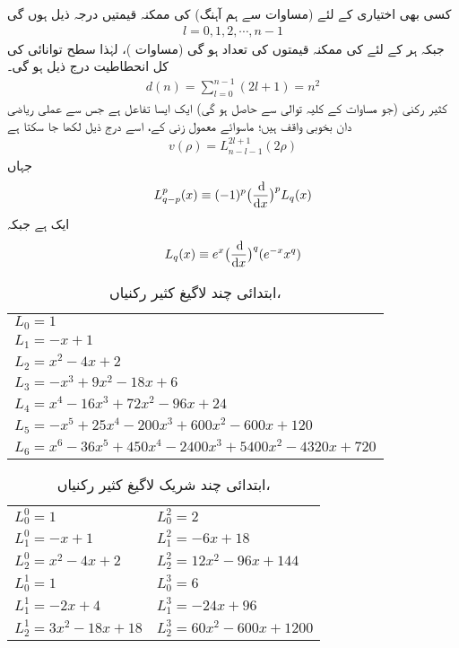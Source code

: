  کسی بھی اختیاری   کے لئے (مساوات  سے ہم آہنگ)  کی ممکنہ قیمتیں درجہ ذیل ہوں گی
\begin{align}
l=0,1,2,\cdots, n-1 
\end{align}
جبکہ ہر   کے لئے    کی ممکنہ قیمتوں کی تعداد    ہو گی (مساوات )،  لہٰذا      سطح توانائی کی کل انحطاطیت درج ذیل ہو گی۔
\begin{align}
d(n)=\sum_{l=0}^{n-1}(2l+1)=n^{2} 
\end{align}
کثیر رکنی  (جو مساوات  کے کلیہ توالی سے حاصل ہو گی) ایک ایسا تفاعل ہے جس سے عملی ریاضی دان بخوبی واقف ہیں؛  ماسوائے معمول زنی کے، اسے درج ذیل لکھا جا سکتا ہے
 \begin{align}\label{مساوات_تین_ابعادی_لاگیغ_الف}
v(\rho)=L_{n-l-1}^{2l+1}(2\rho) 
\end{align}
 جہاں
  \begin{align}\label{مساوات_تین_ابعادی_لاگیغ_ب}
L_{q-p}^{p}(x)\equiv(-1)^{p}\big(\frac{\dif}{\dif{x}}\big)^{p}L_{q}(x) 
\end{align} 
 ایک  ہے جبکہ 
\begin{align}\label{مساوات_تین_ابعادی_لاگیغ_پ}
 L_{q}(x)\equiv e^{x}\big(\frac{\dif}{\dif{x}}\big)^{q}(e^{-x}x^{q}) 
\end{align}
\begin{table}
\caption{ابتدائی چند لاگیغ کثیر رکنیاں، }
\label{جدول_ابعاد_لاگیغ_ابتدائی_چند}
\centering
\renewcommand{\arraystretch}{1.25}
\begin{tabular}{l}
\toprule
$L_0=1$\\
$L_1=-x+1$\\
$L_2=x^2-4x+2$\\
$L_3=-x^3+9x^2-18x+6$\\
$L_4=x^4-16x^3+72x^2-96x+24$\\
$L_5=-x^5+25x^4-200x^3+600x^2-600x+120$\\
$L_6=x^6-36x^5+450x^4-2400x^3+5400x^2-4320x+720$\\
\bottomrule
\end{tabular}
\end{table}
\begin{table}
\caption{ابتدائی چند شریک لاگیغ کثیر رکنیاں، }
\label{جدول_ابعادی_شریک_لاگیغ_کثیر_رکنیاں}
\centering
\renewcommand{\arraystretch}{1.25}
\begin{tabular}{ll}
\toprule
$L_0^0=1$  & $L_0^2=2$\\
$L_1^0=-x+1$  &  $L_1^2=-6x+18$\\
$L_2^0=x^2-4x+2$  &  $L_2^2=12x^2-96x+144$\\
$L_0^1=1$  &  $L_0^3=6$\\
$L_1^1=-2x+4$  &  $L_1^3=-24x+96$\\
$L_2^1=3x^2-18x+18$  &  $L_2^3=60x^2-600x+1200$\\
\bottomrule
\end{tabular}
\end{table}
